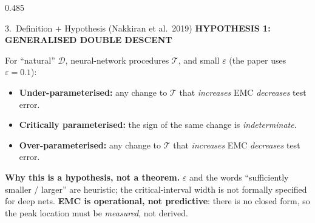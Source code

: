 \documentclass[final]{beamer}
\newcommand{\kw}[1]{\textcolor{uompurple}{\textbf{#1}}}
\newcommand{\eyebrow}[1]{{\color{uompurple}\footnotesize\bfseries\MakeUppercase{#1}}\par\vspace{-0.2ex}}
\newcommand{\chip}[2]{\textcolor{white}{\colorbox{#1}{\strut~\bfseries\small #2~}}}
\newcommand{\T}{\mathcal{T}}
\newcommand{\D}{\mathcal{D}}
\newcommand{\HypBox}[1]{%
  \par\noindent\colorbox{uompurplePale}{\parbox{\linewidth-2\fboxsep}{\small #1}}}
\begin{document}
\begin{frame}[t]{}
\begin{columns}[T,onlytextwidth]
\begin{column}{0.485\linewidth}
\begin{block}{3.~Definition + Hypothesis (Nakkiran et al.\ 2019)}
\vspace{0.4ex}
\eyebrow{Hypothesis 1: Generalised Double Descent}
For ``natural'' \(\D\), neural-network procedures \(\T\), and small \(\varepsilon\) (the paper uses \(\varepsilon=0.1\)):
\begin{itemize}\setlength\itemsep{0.3ex}
\item[\chip{accentteal}{$\mathrm{EMC}\!\ll\! n$}] \kw{Under-parameterised:} any change to \(\T\) that \emph{increases} EMC \emph{decreases} test error.
\item[\chip{accentcoral}{$\mathrm{EMC}\!\approx\! n$}] \kw{Critically parameterised:} the sign of the same change is \emph{indeterminate}.
\item[\chip{accentgreen}{$\mathrm{EMC}\!\gg\! n$}] \kw{Over-parameterised:} any change to \(\T\) that \emph{increases} EMC \emph{decreases} test error.
\end{itemize}

\HypBox{\textbf{Why this is a hypothesis, not a theorem.} \(\varepsilon\) and the words ``sufficiently smaller / larger'' are heuristic; the critical-interval width is not formally specified for deep nets. \kw{EMC is operational, not predictive}: there is no closed form, so the peak location must be \emph{measured}, not derived.}
\end{block}

\end{column}
\end{columns}

\vspace{-0.25cm}


\end{frame}
\end{document}
